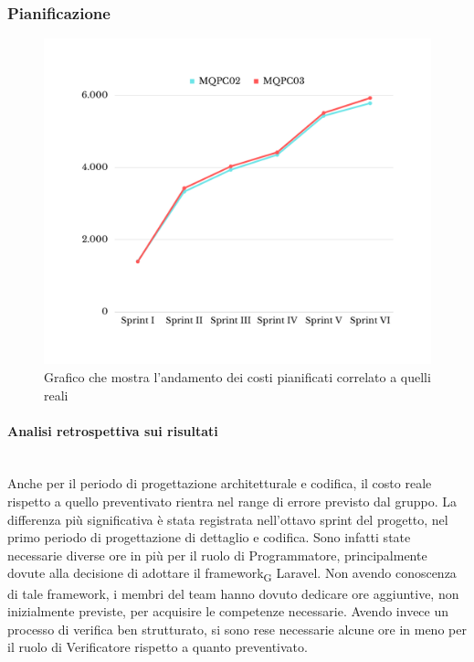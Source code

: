 \subsubsection{Pianificazione}
\begin{figure}[H]
	\centering
	\includegraphics[scale=0.5]{img/BCWS-ACWS.png}
	\caption{Grafico che mostra l'andamento dei costi pianificati correlato a quelli reali}
\end{figure}
\paragraph{Analisi retrospettiva sui risultati}\mbox{}\\
Anche per il periodo di progettazione architetturale e codifica, il costo reale rispetto a quello preventivato rientra nel range di errore previsto dal gruppo. 
La differenza più significativa è stata registrata nell'ottavo sprint del progetto, nel primo periodo di progettazione di dettaglio e codifica. Sono infatti state necessarie diverse ore in più per il ruolo di Programmatore, principalmente dovute alla decisione di adottare il framework\textsubscript{G} Laravel. Non avendo conoscenza di tale framework, i membri del team hanno dovuto dedicare ore aggiuntive, non inizialmente previste, per
acquisire le competenze necessarie.
Avendo invece un processo di verifica ben strutturato, si sono rese necessarie alcune ore in meno per il ruolo di Verificatore rispetto a quanto preventivato.

